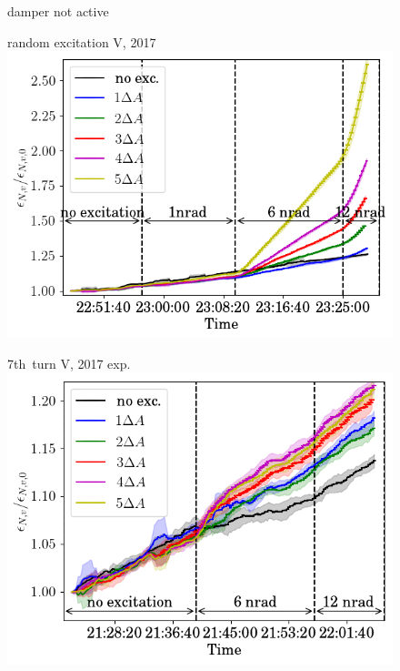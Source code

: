 \documentclass[%
 reprint,
 amsmath,amssymb,
 aps,
prstab,
longbibliography
]{revtex4-1}
\begin{document}
\begin{figure}
	\centering
	damper not active\\
	\begin{minipage}[t]{0.32\linewidth}
		\centering
	random excitation V, 2017\\
		\includegraphics[height=0.75\linewidth]{2017_emitv_avg_rel_vran_no_damper.png}
	\end{minipage}	
	\begin{minipage}[t]{0.32\linewidth}
		\centering
		7th~turn V, 2017 exp.\\
		\includegraphics[height=0.75\linewidth]{2017_emitv_avg_rel_v7th_no_damper_no_text.png}
	\end{minipage}	
	\begin{minipage}[t]{0.32\linewidth}

\end{minipage}
\end{figure}
\end{document}
